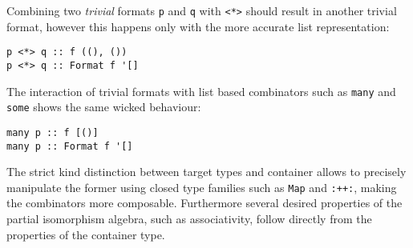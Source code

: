 \documentclass[../Thesis.tex]{subfiles}
\begin{document}
Combining two \emph{trivial} formats \texttt{p} and \texttt{q} with 
\texttt{<*>} should result in another trivial format, however this happens
only with the more accurate list representation:
\begin{verbatim}
p <*> q :: f ((), ())
p <*> q :: Format f '[]
\end{verbatim}

The interaction of trivial formats with list based combinators such as \texttt{many} and \texttt{some} shows the same wicked behaviour:

\begin{verbatim}
many p :: f [()]
many p :: Format f '[]
\end{verbatim}

The strict kind distinction between target types and
container allows to precisely manipulate the former using closed
type families such as \texttt{Map} and \texttt{:++:}, making the
combinators more composable. Furthermore several
desired properties of the partial isomorphism algebra, such as associativity, follow directly from the properties of the container type.
\end{document}
